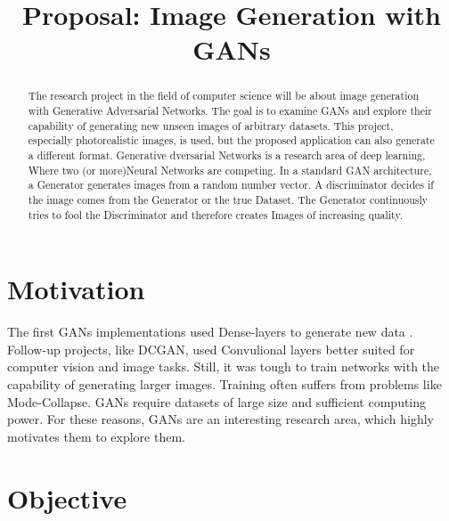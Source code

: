 \documentclass[conference,onecolumn,compsoc]{IEEEtran}
\begin{document}
\title{Proposal: Image Generation with GANs}

\author{
}
\maketitle

\begin{abstract}

\noindent
The research project in the field of computer science will be about image generation with Generative Adversarial Networks. The goal is to examine GANs and explore their capability of generating new unseen images of arbitrary datasets. This project, especially photorealistic images, is used, but the proposed application can also generate a different format. Generative  dversarial Networks is a research area of deep learning, Where two (or more)Neural Networks are competing. In a standard GAN architecture, a Generator generates images from a random number vector. A discriminator decides if the image comes from the Generator or the true Dataset. The Generator continuously tries to fool the Discriminator and therefore creates Images of increasing quality.

\end{abstract}


\section{Motivation}

\noindent
The first GANs implementations used Dense-layers to generate new data \cite{goodfellow2014generative}. Follow-up projects, like DCGAN, \cite{radford2016unsupervised} used Convulional layers better suited for computer vision and image tasks. Still, it was tough to train networks with the capability of generating larger images. Training often suffers from problems like Mode-Collapse. GANs require datasets of large size and sufficient computing power. For these reasons, GANs are an interesting research area, which highly motivates them to explore them.


\section{Objective}
\end{document}
